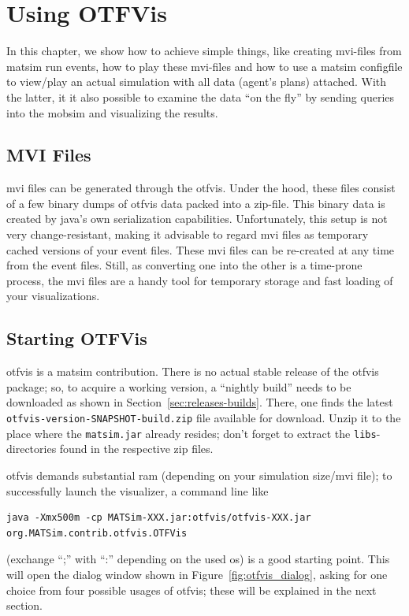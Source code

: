 \section{Using OTFVis} 
In this chapter, we show how to achieve simple things, like creating \gls{mvi}-files from \gls{matsim} run events, how to play these \gls{mvi}-files and how to use a \gls{matsim} \gls{configfile} to view/play an actual simulation with all data (\eg agent's plans) attached. With the latter, it it also possible to examine the data ``on the fly'' by sending queries into the \gls{mobsim} and visualizing the results.

\subsection{MVI Files}
\gls{mvi} files can be generated through the \gls{otfvis}. Under the hood, these files consist of a few binary dumps of \gls{otfvis} data packed into a zip-file. This binary data is created by \gls{java}'s own serialization capabilities. Unfortunately, this setup is not very change-resistant, making it advisable to regard \gls{mvi} files as temporary cached versions of your event files. These \gls{mvi} files can be re-created at any time from the event files. Still, as converting one into the other is a time-prone process, the \gls{mvi} files are a handy tool for temporary storage and fast loading of your visualizations.

\subsection{Starting OTFVis}
\gls{otfvis} is a \gls{matsim} \gls{contribution}. 
There is no actual stable release of the \gls{otfvis} package; 
so, to acquire a working version, a ``nightly build'' needs to be downloaded as shown in Section~\ref{sec:releases-builds}. 
There, one finds the latest \lstinline|otfvis-version-SNAPSHOT-build.zip| file available for download. 
Unzip it to the place where the \lstinline|matsim.jar| already resides; don't forget to extract the \lstinline|libs|-directories found in the respective zip files. 

\gls{otfvis} demands substantial \gls{ram} (depending on your simulation size/\gls{mvi} file); to successfully launch the visualizer, a command line like 
\begin{lstlisting}
java -Xmx500m -cp MATSim-XXX.jar:otfvis/otfvis-XXX.jar org.MATSim.contrib.otfvis.OTFVis
\end{lstlisting}
(exchange ``;'' with ``:'' depending on the used \gls{os})
is a good starting point. 
This will open the dialog window shown in Figure~\ref{fig:otfvis_dialog}, asking for one choice from four possible usages of \gls{otfvis}; 
these will be explained in the next section.


